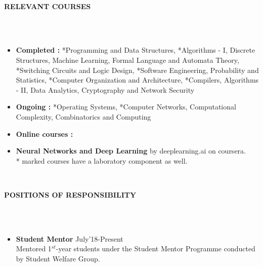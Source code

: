\documentclass[letter,10pt]{book}
\newcommand{\lsep}{-0.5cm}
\newcommand{\resheading}[1]{{\small \colorbox{mygrey}{\begin{minipage}{0.975\textwidth}{\textbf{#1 \vphantom{p\^{E}}}}\end{minipage}}}}
\begin{document}
\hspace{0.5cm}\\[-0.2cm]
\resheading{\textbf{RELEVANT COURSES} }\\[\lsep]
\\[-1em]
\begin{itemize}
\item \textbf{Completed : }*Programming and Data Structures, *Algorithms - I, Discrete Structures, Machine Learning, Formal Language and Automata Theory, *Switching Circuits and Logic Design, *Software Engineering, Probability and Statistics, *Computer Organization and Architecture, *Compilers, Algorithms - II, Data Analytics, Cryptography and Network Security 
\\[-2em]
\item \textbf{Ongoing :}  *Operating Systems, *Computer Networks, Computational Complexity, Combinatorics and Computing\\[-2em]
\item \textbf{Online courses :} \\[-2em]
\addtolength{\itemindent}{0.5cm}
\item  \textbf{Neural Networks and Deep Learning} by deeplearning.ai on coursera.\\
{*} marked courses have a laboratory component as well.
\end{itemize}

\hspace{0.5cm}\\[-0.2cm]
\resheading{\textbf{POSITIONS OF RESPONSIBILITY} }\\[\lsep]
\\[-1em]
\begin{itemize}
\item \large \textbf{Student Mentor} \hfill July'18-Present \normalsize\ \\ 
Mentored 1$^{st} $-year students under the Student Mentor Programme conducted by Student Welfare Group.
\end{itemize}
\end{document}
